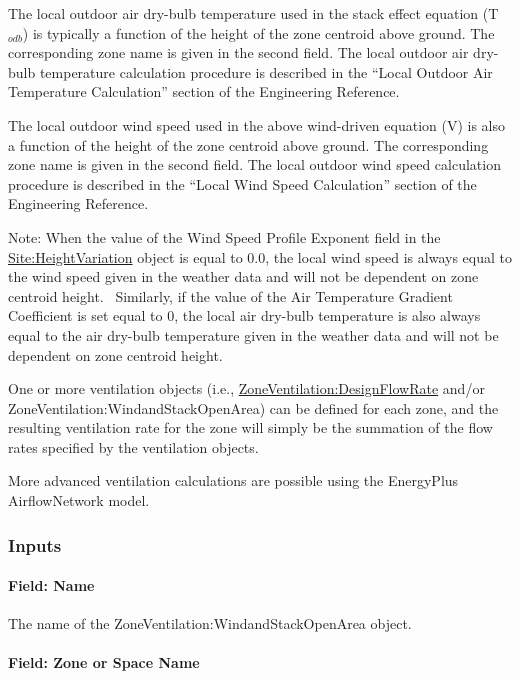 The local outdoor air dry-bulb temperature used in the stack effect equation (T\(_{odb}\)) is typically a function of the height of the zone centroid above ground. The corresponding zone name is given in the second field. The local outdoor air dry-bulb temperature calculation procedure is described in the ``Local Outdoor Air Temperature Calculation'' section of the Engineering Reference.

The local outdoor wind speed used in the above wind-driven equation (V) is also a function of the height of the zone centroid above ground. The corresponding zone name is given in the second field. The local outdoor wind speed calculation procedure is described in the ``Local Wind Speed Calculation'' section of the Engineering Reference.

Note: When the value of the Wind Speed Profile Exponent field in the \hyperref[siteheightvariation]{Site:HeightVariation} object is equal to 0.0, the local wind speed is always equal to the wind speed given in the weather data and will not be dependent on zone centroid height.~ Similarly, if the value of the Air Temperature Gradient Coefficient is set equal to 0, the local air dry-bulb temperature is also always equal to the air dry-bulb temperature given in the weather data and will not be dependent on zone centroid height.

One or more ventilation objects (i.e., \hyperref[zoneventilationdesignflowrate]{ZoneVentilation:DesignFlowRate} and/or ZoneVentilation:WindandStackOpenArea) can be defined for each zone, and the resulting ventilation rate for the zone will simply be the summation of the flow rates specified by the ventilation objects.

More advanced ventilation calculations are possible using the EnergyPlus AirflowNetwork model.

\subsubsection{Inputs}\label{inputs-3-004}

\paragraph{Field: Name}\label{field-name-3-004}

The name of the ZoneVentilation:WindandStackOpenArea object.

\paragraph{Field: Zone or Space Name}\label{field-zone-name-2016-06-16}

